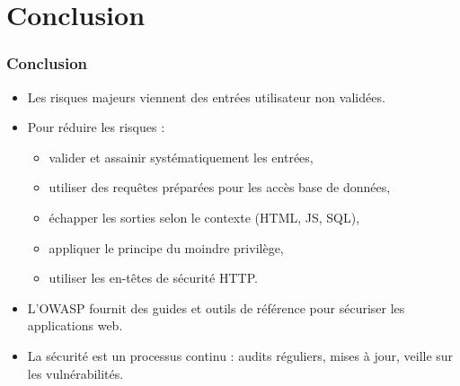 \documentclass{beamer}
\begin{document}
\section{Conclusion}

\begin{frame}
\frametitle{Conclusion}

\begin{itemize}
\item Les risques majeurs viennent des \alert{entrées utilisateur non validées}.
\item Pour réduire les risques :
\begin{itemize}
\item valider et assainir systématiquement les entrées,
\item utiliser des requêtes préparées pour les accès base de données,
\item échapper les sorties selon le contexte (HTML, JS, SQL),
\item appliquer le principe du moindre privilège,
\item utiliser les en-têtes de sécurité HTTP.
\end{itemize}
\item L'OWASP fournit des guides et outils de référence pour sécuriser les applications web.
\item La sécurité est un \alert{processus continu} : audits réguliers, mises à jour, veille sur les vulnérabilités.
\end{itemize}
\end{frame}
\end{document}
